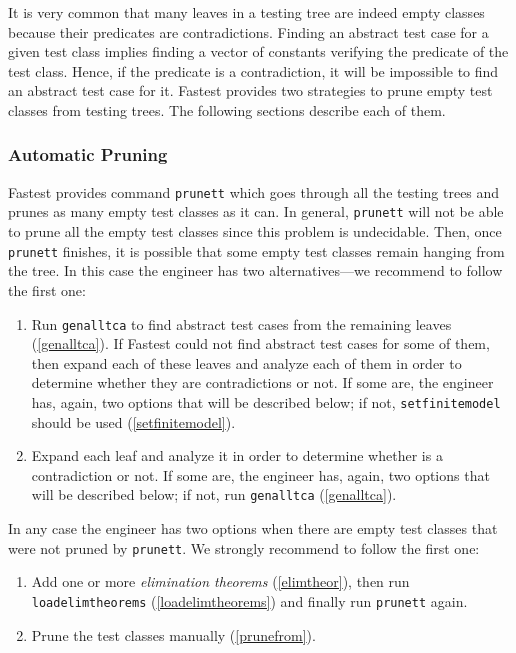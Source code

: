 It is very common that many leaves in a testing tree are indeed empty classes because their predicates are contradictions. Finding an abstract test case for a given test class implies finding a vector of constants verifying the predicate of the test class. Hence, if the predicate is a contradiction, it will be impossible to find an abstract test case for it. Fastest provides two strategies to prune empty test classes from testing trees. The following sections describe each of them.

\subsubsection{\label{prunett}Automatic Pruning}

Fastest provides command \verb+prunett+ which goes through all the testing trees and prunes as many empty test classes as it can. In general, \verb+prunett+ will not be able to prune all the empty test classes since this problem is undecidable. Then, once \verb+prunett+ finishes, it is possible that some empty test classes remain hanging from the tree. In this case the engineer has two alternatives---we recommend to follow the first one:

\begin{enumerate}
\item Run \verb+genalltca+ to find abstract test cases from the remaining leaves (\ref{genalltca}). If Fastest could not find abstract test cases for some of them, then expand each of these leaves and analyze each of them in order to determine whether they are contradictions or not. If some are, the engineer has, again, two options that will be described below; if not, \verb+setfinitemodel+ should be used (\ref{setfinitemodel}).

\item Expand each leaf and analyze it in order to determine whether is a contradiction or not. If some are, the engineer has, again, two options that will be described below; if not, run \verb+genalltca+ (\ref{genalltca}).
\end{enumerate}

In any case the engineer has two options when there are empty test classes that were not pruned by \verb+prunett+. We strongly recommend to follow the first one:

\begin{enumerate}
\item Add one or more {\it elimination theorems} (\ref{elimtheor}), then run \verb+loadelimtheorems+ (\ref{loadelimtheorems}) and finally run \verb+prunett+ again.

\item Prune the test classes manually (\ref{prunefrom}).
\end{enumerate}

